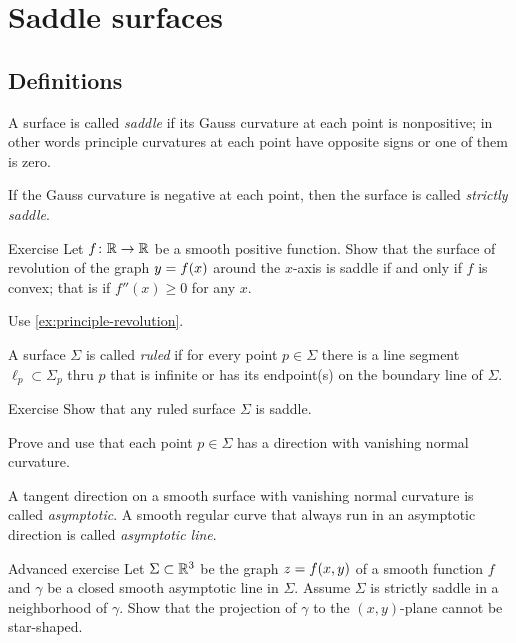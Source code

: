 \chapter{Saddle surfaces}

\section*{Definitions}

A surface is called \emph{saddle} if its Gauss curvature at each point is nonpositive;
in other words principle curvatures at each point have opposite signs or one of them is zero.

If the Gauss curvature is negative at each point,
then the surface is called \emph{strictly saddle}.


\begin{thm}{Exercise}\label{ex:convex-revolution}
Let $f\colon\mathbb{R}\to\mathbb{R}$ be a smooth positive function.
Show that the surface of revolution of the graph $y\z=f(x)$ around the $x$-axis
 is saddle if and only if $f$ is convex; that is if $f''(x)\ge0$ for any $x$.
\end{thm}

 Use \ref{ex:principle-revolution}.

A surface $\Sigma$ is called \emph{ruled} if for every point $p\in \Sigma$ there is a line segment $\ell_p\subset \Sigma_p$ thru $p$ that is infinite or has its endpoint(s) on the boundary line of $\Sigma$.

\begin{thm}{Exercise}
Show that any ruled surface $\Sigma$ is saddle.
\end{thm}

 Prove and use that each point $p\in\Sigma$ has a direction with vanishing normal curvature.

A tangent direction on a smooth surface with vanishing normal curvature is called \emph{asymptotic}.
A smooth regular curve that always run in an asymptotic direction is called
\emph{asymptotic line}.

\begin{thm}{Advanced exercise}
Let $\Sigma\subset \mathbb{R}^3$ be the graph $z\z=f(x,y)$
of a smooth function $f$ 
and $\gamma$ be a closed smooth asymptotic line in $\Sigma$.
Assume $\Sigma$ is strictly saddle in a neighborhood of $\gamma$.
Show that the projection of $\gamma$ to the $(x, y)$-plane cannot be star-shaped.
\end{thm}

